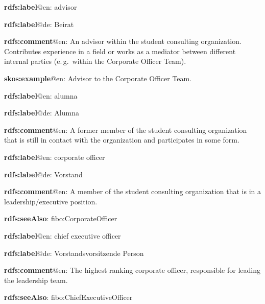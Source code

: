 \documentclass[a4paper, DIV=13, BCOR=0cm]{scrbook}
\newcommand{\eg}{e.\,g.\ }
\begin{document}
\begin{mdframed}[style=onto-2, frametitle={Advisor}]
	{%
		\begin{compactitem}
			\item \textbf{rdfs:label}@en: advisor
			\item \textbf{rdfs:label}@de: Beirat
			\item \textbf{rdfs:comment}@en: An advisor within the student consulting organization. Contributes experience in a field or works as a mediator between different internal parties (\eg within the Corporate Officer Team).
			\item \textbf{skos:example}@en: Advisor to the Corporate Officer Team.
		\end{compactitem}
	} %
\end{mdframed}

\begin{mdframed}[style=onto-2, frametitle={Aluma}]
	{%
		\begin{compactitem}
			\item \textbf{rdfs:label}@en: alumna
			\item \textbf{rdfs:label}@de: Alumna
			\item \textbf{rdfs:comment}@en: A former member of the student consulting organization that is still in contact with the organization and participates in some form.
		\end{compactitem}
	} %
\end{mdframed}

\begin{mdframed}[style=onto-2, frametitle={Corporate\_Officer}]
	{%
		\begin{compactitem}
			\item \textbf{rdfs:label}@en: corporate officer
			\item \textbf{rdfs:label}@de: Vorstand
			\item \textbf{rdfs:comment}@en: A member of the student consulting organization that is in a leadership/executive position.
			\item \textbf{rdfs:seeAlso}: fibo:CorporateOfficer
		\end{compactitem}
	} %
\end{mdframed}

\begin{mdframed}[style=onto-3, frametitle={Chief\_Executive\_Officer}]
	{%
		\begin{compactitem}
			\item \textbf{rdfs:label}@en: chief executive officer
			\item \textbf{rdfs:label}@de: Vorstandsvorsitzende Person
			\item \textbf{rdfs:comment}@en: The highest ranking corporate officer, responsible for leading the leadership team.
			\item \textbf{rdfs:seeAlso}: fibo:ChiefExecutiveOfficer
		\end{compactitem}
	} %
\end{mdframed}
\end{document}
